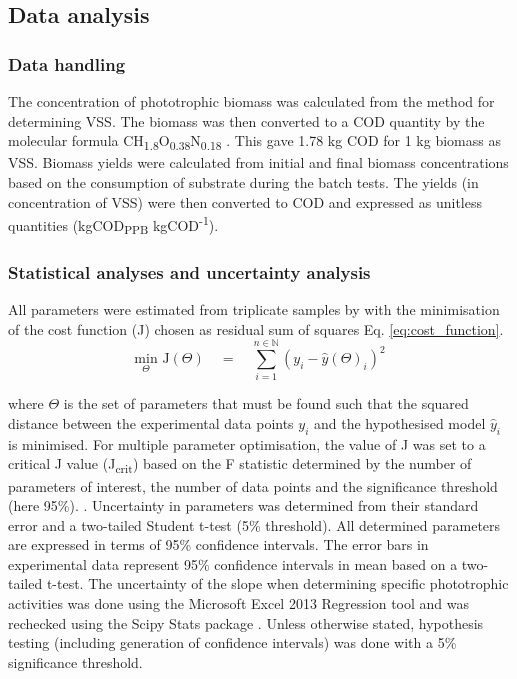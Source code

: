 \subsection{Data analysis}
\subsubsection{Data handling}
The concentration of phototrophic biomass was calculated from the method for determining VSS. The biomass was then converted to a COD quantity by the molecular formula CH\textsubscript{1.8}O\textsubscript{0.38}N\textsubscript{0.18} \cite{mckinlay2010}. This gave 1.78 kg COD for 1 kg biomass as VSS. Biomass yields were calculated from initial and final biomass concentrations based on the consumption of substrate during the batch tests. The yields (in concentration of VSS) were then converted to COD and expressed as unitless quantities (kgCOD\textsubscript{PPB} kgCOD\textsuperscript{-1}). 

\subsubsection{Statistical analyses and uncertainty analysis}
All parameters were estimated from triplicate samples by with the minimisation of the cost function (J) chosen as residual sum of squares Eq. \eqref{eq:cost_function}.
\begin{equation}
    \label{eq:cost_function}
    \underset{\Theta}{\mathrm{min}}\, \, \mathrm{J}(\Theta)\quad  = \quad \sum_{i = 1}^{n\in\mathbb{N}} \left(y_i - \hat{y}(\Theta)_i    \right)^2
\end{equation}

\noindent where $\Theta$ is the set of parameters that must be found such that the squared distance between the experimental data points $y_i$ and the hypothesised model $\hat{y}_i$ is minimised. For multiple parameter optimisation, the value of J was set to a critical J value (J\textsubscript{crit}) based on the F statistic determined by the number of parameters of interest, the number of data points and the significance threshold (here 95\%). \cite{batstone2003}. Uncertainty in parameters was determined from their standard error and a two-tailed Student t-test (5\% threshold). All determined parameters are expressed in terms of 95\% confidence intervals. The error bars in experimental data represent 95\% confidence intervals in mean based on a two-tailed t-test. The uncertainty of the slope when determining specific phototrophic activities was done using the Microsoft Excel 2013 Regression tool and was rechecked using the Scipy Stats package \cite{jones2001}. Unless otherwise stated, hypothesis testing (including generation of confidence intervals) was done with a 5\% significance threshold.


